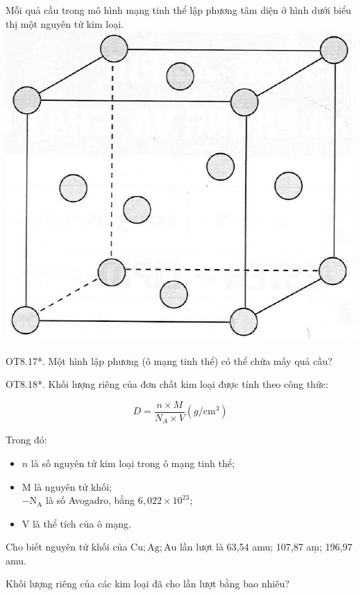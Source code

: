 \documentclass[10pt]{article}
\begin{document}
Mỗi quả cầu trong mô hình mạng tinh thể lập phương tâm diện ở hình dưới biểu thị một nguyên tử kim loại.\\
\includegraphics[max width=\textwidth, center]{2025_10_23_de6f5713836e4e91b3c8g-135}

OT8.17*. Một hình lập phương (ô mạng tinh thể) có thể chứa mấy quả cầu?

OT8.18*. Khối lượng riêng của đơn chất kim loại được tính theo công thức:

$$
D=\frac{n \times M}{N_{A} \times V}\left(g / \mathrm{cm}^{3}\right)
$$

Trong đó:

\begin{itemize}
  \item $n$ là số nguyên tử kim loại trong ô mạng tinh thể;
  \item M là nguyên tử khối;\\
$-\mathrm{N}_{\mathrm{A}}$ là số Avogadro, bằng $6,022 \times 10^{23}$;
  \item V là thể tích của ô mạng.
\end{itemize}

Cho biết nguyên tử khối của $\mathrm{Cu} ; \mathrm{Ag} ; \mathrm{Au}$ lần lượt là 63,54 amu; 107,87 aṃ; 196,97 amu.

Khối lượng riêng của các kim loại đã cho lần lượt bằng bao nhiêu?
\end{document}
